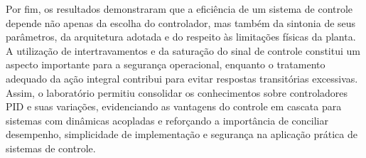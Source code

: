 \documentclass[a4paper,12pt]{article}
\begin{document}
\begin{justify}
    \hspace{4ex}Por fim, os resultados demonstraram que a eficiência de um sistema de controle depende não apenas da escolha do controlador, mas também da sintonia de seus parâmetros, da arquitetura adotada e do respeito às limitações físicas da planta. A utilização de intertravamentos e da saturação do sinal de controle constitui um aspecto importante para a segurança operacional, enquanto o tratamento adequado da ação integral contribui para evitar respostas transitórias excessivas. Assim, o laboratório permitiu consolidar os conhecimentos sobre controladores PID e suas variações, evidenciando as vantagens do controle em cascata para sistemas com dinâmicas acopladas e reforçando a importância de conciliar desempenho, simplicidade de implementação e segurança na aplicação prática de sistemas de controle.
\end{justify}

\newpage


{}
{}



\end{document}
